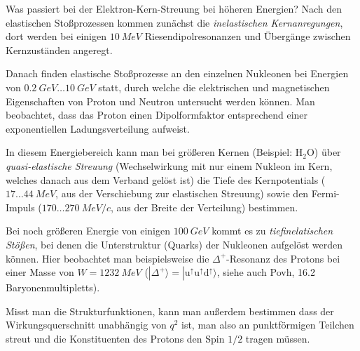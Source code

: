 \begin{fquestion}{Was passiert bei der Elektron-Kern-Streuung bei höheren Energien?}
    Nach den elastischen Stoßprozessen kommen zunächst die \textit{inelastischen Kernanregungen}, dort werden bei einigen $\SI{10}{MeV}$ Riesendipolresonanzen und Übergänge zwischen Kernzuständen angeregt.
    
    Danach finden elastische Stoßprozesse an den einzelnen Nukleonen bei Energien von $\SI{0.2}{GeV}\ldots\SI{10}{GeV}$ statt, durch welche die elektrischen und magnetischen Eigenschaften von Proton und Neutron untersucht werden können. 
    Man beobachtet, dass das Proton einen Dipolformfaktor entsprechend einer exponentiellen Ladungsverteilung aufweist.
    
    In diesem Energiebereich kann man bei größeren Kernen (Beispiel: $\text{H}_2$O) über \textit{quasi-elastische Streuung} (Wechselwirkung mit nur einem Nukleon im Kern, welches danach aus dem Verband gelöst ist) die Tiefe des Kernpotentials ($17\ldots\SI{44}{MeV}$, aus der Verschiebung zur elastischen Streuung) sowie den Fermi-Impuls ($170 \ldots \SI{270}{MeV/c}$, aus der Breite der Verteilung) bestimmen.
    
    Bei noch größeren Energie von einigen $\SI{100}{GeV}$ kommt es zu \textit{tiefinelatischen Stößen}, bei denen die Unterstruktur (Quarks) der Nukleonen aufgelöst werden können.
    Hier beobachtet man beispielsweise die $\Delta^+$-Resonanz des Protons bei einer Masse von $W=\SI{1232}{MeV}$ ($|\Delta^+\rangle = |\mathrm{u}^\uparrow \mathrm{u}^\uparrow \mathrm{d}^\uparrow \rangle$, siehe auch Povh, 16.2 Baryonenmultipletts).
    
    Misst man die Strukturfunktionen, kann man außerdem bestimmen dass der Wirkungsquerschnitt unabhängig von $q^2$ ist, man also an punktförmigen Teilchen streut und die Konstituenten des Protons den Spin $1/2$ tragen müssen.
\end{fquestion}




